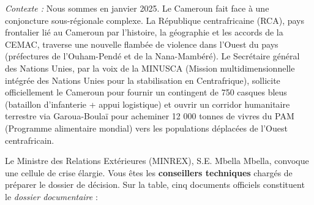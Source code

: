 \documentclass[11pt]{article}
\newcommand{\cle}[1]{{\popxbold\color{popdark}#1}}
\newcounter{popsec}
\newcounter{popsub}
\newcommand{\courssub}[1]{%
  \stepcounter{popsub}%
  \par\vspace{9pt}\noindent{\popxbold\fontsize{11.5}{13}\selectfont\color{popink}{\color{poporange}\thepopsec.\thepopsub}\hspace{6pt}#1}\par\nopagebreak\vspace{4pt}
}
\begin{document}
\courssub{Situation}
\emph{Contexte :} Nous sommes en janvier 2025. Le Cameroun fait face à une conjoncture sous-régionale complexe. La République centrafricaine (RCA), pays frontalier lié au Cameroun par l'histoire, la géographie et les accords de la \cle{CEMAC}, traverse une nouvelle flambée de violence dans l'Ouest du pays (préfectures de l'Ouham-Pendé et de la Nana-Mambéré). Le Secrétaire général des Nations Unies, par la voix de la MINUSCA (Mission multidimensionnelle intégrée des Nations Unies pour la stabilisation en Centrafrique), sollicite officiellement le Cameroun pour fournir un contingent de 750 casques bleus (bataillon d'infanterie + appui logistique) et ouvrir un corridor humanitaire terrestre via Garoua-Boulaï pour acheminer 12 000 tonnes de vivres du PAM (Programme alimentaire mondial) vers les populations déplacées de l'Ouest centrafricain.

Le Ministre des Relations Extérieures (MINREX), S.E. Mbella Mbella, convoque une cellule de crise élargie. Vous êtes les \textbf{conseillers techniques} chargés de préparer le dossier de décision. Sur la table, cinq documents officiels constituent le \emph{dossier documentaire} :
\end{document}
